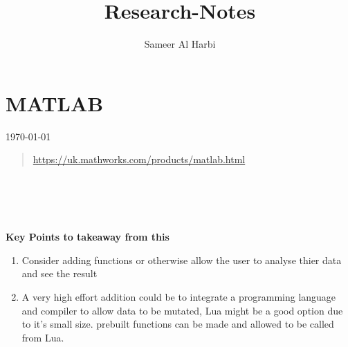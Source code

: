 \documentclass{paper}
\title{Research-Notes}
\author{Sameer Al Harbi}
\begin{document}
\part{MATLAB}
\today
\begin{quote}
\url{https://uk.mathworks.com/products/matlab.html}
\end{quote}
\\
\\
\\
\\
\textbf{Key Points to takeaway from this}
\begin{enumerate}
    \item Consider adding functions or otherwise allow the user to analyse thier data and see the result
    \item A very high effort addition could be to integrate a programming language and compiler to allow data to be mutated, Lua might be a good option due to it's small size. prebuilt functions can be made and allowed to be called from Lua.  
    
\end{enumerate}
\end{document}

